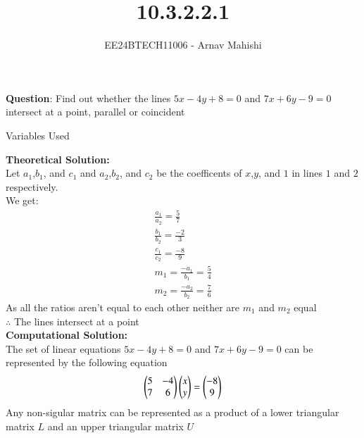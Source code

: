 \documentclass[journal]{IEEEtran}
\begin{document}

\vspace{3cm}

\title{10.3.2.2.1}
\author{EE24BTECH11006 - Arnav Mahishi}
{\let\newpage\relax\maketitle}

\renewcommand{\thefigure}{\theenumi}
\renewcommand{\thetable}{\theenumi}
\setlength{\intextsep}{10pt} %


\renewcommand{\thetable}{\theenumi}


\textbf{Question}:\newline
Find out whether the lines $5x-4y+8=0$ and $7x+6y-9=0$ intersect at a point, parallel or coincident 
\newline
\begin{table}[h!]    
  \centering
  
  \caption{Variables Used}
  \label{tab1.1.2.2}
\end{table}
\newline
\textbf{Theoretical Solution:}\\
Let $a_1$,$b_1$, and $c_1$ and $a_2$,$b_2$, and $c_2$ be the coefficents of $x$,$y$, and $1$ in lines $1$ and $2$ respectively.\\
We get:
\begin{align}
    \frac{a_1}{a_2}=\frac{5}{7}\\
    \frac{b_1}{b_2}=\frac{-2}{3}\\
    \frac{c_1}{c_2}=\frac{-8}{9}\\
    m_1=\frac{-a_1}{b_1}=\frac{5}{4}\\
    m_2=\frac{-a_2}{b_2}=\frac{7}{6}
\end{align}
As all the ratios aren't equal to each other neither are $m_1$ and $m_2$ equal\\
$\therefore$ The lines intersect at a point\\
\textbf{Computational Solution:}\\
The set of linear equations $5x-4y+8=0$ and $7x+6y-9=0$ can be represented by the following equation
\begin{align}
    \begin{pmatrix}5&-4\\7&6\end{pmatrix}\begin{pmatrix}x\\y\end{pmatrix}=\begin{pmatrix}-8\\9\end{pmatrix}
\end{align}
Any non-sigular matrix can be represented as a product of a lower triangular matrix $L$ and an
upper triangular matrix $U$
\end{document}
